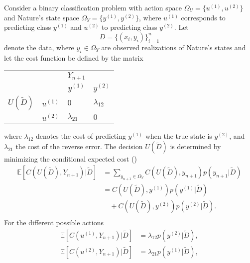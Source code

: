\newpage
\begin{example}
	Consider a binary classification problem with action space $\Omega_U = \{u^{(1)},u^{(2)}\}$ and Nature's state space $\Omega_Y = \{y^{(1)}, y^{(2)}\}$, where $u^{(1)}$ corresponds to predicting class $y^{(1)}$ and $u^{(2)}$ to predicting class $y^{(2)}$. Let
	\begin{equation}
		D = \{(x_i,y_i)\}_{i=1}^n
	\end{equation}
	denote the data, where $y_i \in \Omega_Y$ are observed realizations of Nature's states and let the cost function be defined by the matrix
	\begin{center}
		\begin{tabular}{ c  c  c  c }
			&& $Y_{n+1}$& \\
			&& $y^{(1)}$ & $y^{(2)}$  \\
			\cline{3-4}
			$U(\tilde{D})$ & $u^{(1)}$& \multicolumn{1}{|l}{$0$} &\multicolumn{1}{l|}{$\lambda_{12}$}  \\
			& $u^{(2)}$& \multicolumn{1}{|l}{$\lambda_{21}$} & \multicolumn{1}{l|}{$0$} \\
			\cline{3-4}
		\end{tabular}
	\end{center}
	where $\lambda_{12}$ denotes the cost of predicting $y^{(1)}$ when the true state is $y^{(2)}$, and $\lambda_{21}$ the cost of the reverse error.  The decision $U(\tilde{D})$ is determined by minimizing the conditional expected cost ()
	\begin{equation}
		\begin{split}
			\mathbb{E}[C(U(\tilde{D}), Y_{n+1})|\tilde{D}] & = \sum_{y_{n+1}\in \Omega_Y}C(U(\tilde{D}),y_{n+1})p(y_{n+1}|\tilde{D})\\
			& = C(U(\tilde{D}),y^{(1)})p(y^{(1)}|\tilde{D})\\
			& \quad+C(U(\tilde{D}),y^{(2)})p(y^{(2)}|\tilde{D}).\\
		\end{split}
	\end{equation}
	For the different possible actions
	\begin{equation}
		\begin{split}
			\mathbb{E}[C(u^{(1)}, Y_{n+1})|\tilde{D}] &= \lambda_{12}p(y^{(2)}|\tilde{D}),\\
			\mathbb{E}[C(u^{(2)}, Y_{n+1})|\tilde{D}] &= \lambda_{21}p(y^{(1)}|\tilde{D}),\\
		\end{split}
	\end{equation}

\end{example}

